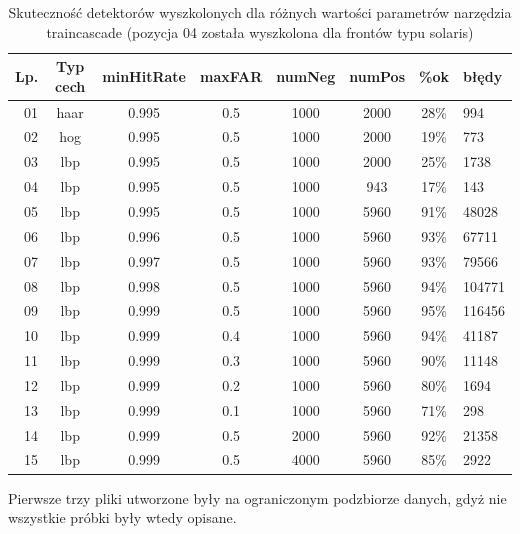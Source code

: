\begin{table}[!h]
    \centering
    \begin{tabular}{r|c|c|c|c|c|c|l}
Lp.       & Typ cech & minHitRate & maxFAR & numNeg & numPos & \%ok & błędy\\
          \hline
01        & haar     & 0.995      & 0.5       & 1000 & 2000 & 28\% &  994 \\
02        & hog      & 0.995      & 0.5       & 1000 & 2000 & 19\% &  773 \\
03        & lbp      & 0.995      & 0.5       & 1000 & 2000 & 25\% &  1738 \\
04        & lbp      & 0.995      & 0.5       & 1000 & 943  & 17\% &  143 \\
05        & lbp      & 0.995      & 0.5       & 1000 & 5960 & 91\% &  48028 \\
06        & lbp      & 0.996      & 0.5       & 1000 & 5960 & 93\% &  67711 \\
07        & lbp      & 0.997      & 0.5       & 1000 & 5960 & 93\% &  79566 \\
08        & lbp      & 0.998      & 0.5       & 1000 & 5960 & 94\% &  104771 \\
09        & lbp      & 0.999      & 0.5       & 1000 & 5960 & 95\% &  116456 \\
10        & lbp      & 0.999      & 0.4       & 1000 & 5960 & 94\% &  41187 \\
11        & lbp      & 0.999      & 0.3       & 1000 & 5960 & 90\% &  11148 \\
12        & lbp      & 0.999      & 0.2       & 1000 & 5960 & 80\% &  1694 \\
13        & lbp      & 0.999      & 0.1       & 1000 & 5960 & 71\% &  298 \\
14        & lbp      & 0.999      & 0.5       & 2000 & 5960 & 92\% &  21358 \\
15        & lbp      & 0.999      & 0.5       & 4000 & 5960 & 85\% &  2922 \\
    \end{tabular}                                                            
    \caption{Skuteczność detektorów wyszkolonych 
        dla różnych wartości parametrów narzędzia traincascade
        (pozycja 04 została wyszkolona dla frontów typu solaris)
    }
    \label{tab:it1detectorlist}
\end{table}

Pierwsze trzy pliki utworzone były na ograniczonym podzbiorze danych, gdyż
nie wszystkie próbki były wtedy opisane.

